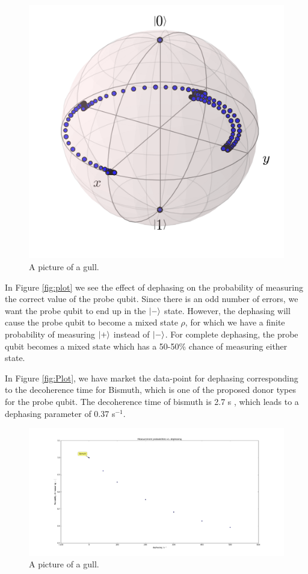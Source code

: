 \begin{figure}[!ht]
  \caption{A picture of a gull.}
  \centering
    \includegraphics[width=\textwidth]{Figures/Circ_orbit_odd_100_dephasing.png}
\end{figure}

In Figure \ref{fig:plot} we see the effect of dephasing on the probability of measuring the correct value of the probe qubit. Since there is an odd number of errors, we want the probe qubit to end up in the $\ket{-}$ state. However, the dephasing will cause the probe qubit to become a mixed state $\rho$, for which we have a finite probability of measuring $\ket{+} $ instead of $\ket{-}$. For complete dephasing, the probe qubit becomes a mixed state which has a 50-50\% chance of measuring either state. 

In Figure \ref{fig:Plot}, we have market the data-point for dephasing corresponding to the decoherence time for Bismuth, which is one of the proposed donor types for the probe qubit. The decoherence time of bismuth is 2.7 s \cite{something}, which leads to a dephasing parameter of 0.37 s$^{-1}$. 

\begin{figure}[!ht]
  \caption{A picture of a gull.}
  \centering
    \includegraphics[width=\textwidth]{Figures/measurement_dephasing_graph.png}
\end{figure}

